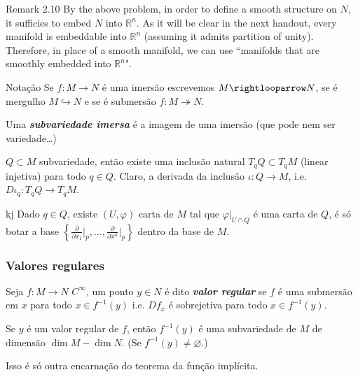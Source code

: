 \begin{thing5}{Remark 2.10}\leavevmode
By the above problem, in order to define a smooth structure on $N$, it sufficies to embed $N$ into \(\mathbb{R}^n\). As it will be clear in the next handout, every manifold is embeddable into \(\mathbb{R}^n\) (assuming it admits partition of unity). Therefore, in place of a smooth manifold, we can use ``manifolds that are smoothly embedded into \(\mathbb{R}^n\)".
\end{thing5}

\begin{thing3}{Notação}\leavevmode
Se \(f:M \to N\) é uma imersão escrevemos \(M \rightlooparrow N\), se é mergulho \(M \hookrightarrow N\) e se é submersão \(f: M \twoheadrightarrow N\).
\end{thing3}
Uma \textit{\textbf{subvariedade imersa}} é a imagem de uma imersão (que pode nem ser variedade…)

\begin{remark}\leavevmode
	\(Q \subset M\) subvariedade, então existe uma inclusão natural \(T_qQ \subset T_q M\) (linear injetiva) para todo \(q \in Q\). Claro, a derivada da inclusão \(\iota:Q \to M\), i.e. \(D\iota_q:T_qQ \to T_qM\).
\end{remark}
kj
Dado \(q \in Q\), existe \((U,\varphi)\) carta de \(M\) tal que \(\varphi|_{U \cap Q}\) é uma carta de \(Q\), é só botar a base \(\left\{\frac{\partial}{\partial x_1}\Big|_{p},\ldots,\frac{\partial}{\partial x^n}\Big|_{p}\right\}\) dentro da base de \(M\).

\subsubsection{Valores regulares}
\begin{defn}\leavevmode
	Seja \(f:M \to N\) \(C^\infty\), um ponto \(y \in N \) é dito \textit{\textbf{valor regular}} se $f$ é uma submersão em $x$ para todo \(x \in f^{-1}(y)\) i.e. \(Df_x\) é sobrejetiva para todo \(x \in f^{-1}(y)\).
\end{defn}

\begin{thm}\leavevmode
Se \(y \) é um valor regular de $f$, então \(f^{-1}(y)\) é uma subvariedade de \(M\) de dimensão \(\dim M- \dim N\). (Se \(f^{-1}(y)\neq \varnothing\).)
\end{thm}

\begin{remark}\leavevmode
	Isso é só outra encarnação do teorema da função implícita.
\end{remark}

